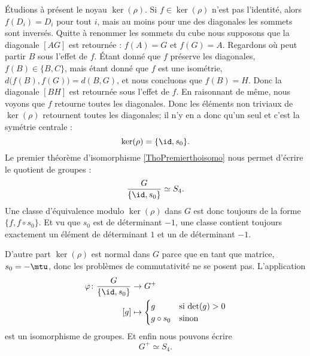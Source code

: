 Étudions à présent le noyau \( \ker(\rho)\). Si \( f\in\ker(\rho)\) n'est pas l'identité, alors \( f(D_i)=D_i\) pour tout \( i\), mais au moins pour une des diagonales les sommets sont inversés. Quitte à renommer les sommets du cube nous supposons que la diagonale \( [AG]\) est retournée : \( f(A)=G\) et \( f(G)=A\). Regardons où peut partir \( B\) sous l'effet de \( f\). Étant donné que \( f\) préserve les diagonales, \( f(B)\in\{ B,C \}\), mais étant donné que \( f\) est une isométrie, \( d\big( f(B),f(G) \big)=d(B,G)\), et nous concluons que \( f(B)=H\). Donc la diagonale \( [BH]\) est retournée sous l'effet de \( f\). En raisonnant de même, nous voyons que \( f\) retourne toutes les diagonales. Donc les éléments non triviaux de \( \ker(\rho)\) retournent toutes les diagonales; il n'y en a donc qu'un seul et c'est la symétrie centrale :
\begin{equation}
    \ker(\rho)=\{ \id,s_0 \}.
\end{equation}
Le premier théorème d'isomorphisme \ref{ThoPremierthoisomo} nous permet d'écrire le quotient de groupes :
\begin{equation}
    \frac{ G }{ \{ \id,s_0 \} }\simeq S_4.
\end{equation}
Une classe d'équivalence modulo \( \ker(\rho)\) dans \( G\) est donc toujours de la forme \( \{ f,f\circ s_0 \}\). Et vu que \( s_0\) est de déterminant \( -1\), une classe contient toujours exactement un élément de déterminant \( 1\) et un de déterminant \( -1\).

D'autre part \( \ker(\rho)\) est normal dans \( G\) parce que en tant que matrice, \( s_0=-\mtu\), donc les problèmes de commutativité ne se posent pas. L'application
\begin{equation}
    \begin{aligned}
        \varphi\colon \frac{ G }{ \{ \id,s_0 \} }&\to G^+ \\
        [g]&\mapsto \begin{cases}
            g    &   \text{si \( \det(g)>0\)}\\
            g\circ s_0    &    \text{sinon}
        \end{cases}
    \end{aligned}
\end{equation}
est un isomorphisme de groupes. Et enfin nous pouvons écrire 
\begin{equation}
    G^+\simeq S_4.
\end{equation}

